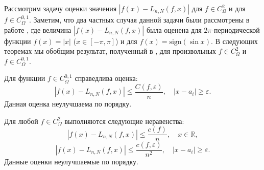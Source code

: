 Рассмотрим задачу оценки значения $\left|f(x)-L_{n,N}(f,x)\right|$ для $f\in C_{\Omega}^{2}$ и для $f\in C_{\Omega}^{0,1}$.
Заметим, что два частных случая данной задачи были рассмотрены в работе \cite{akniyev}, где величина $\left|f(x)-L_{n,N}(f,x)\right|$ была
оценена для $2\pi$-периодической функции $f(x) = |x|$ ($x \in [-\pi,\pi]$) и для $f(x) = \mbox{sign} (\sin x)$.
В следующих теоремах мы обобщим результат, полученный в \cite{akniyev}, для произвольных $f \in C_{\Omega}^{2}$ и $f \in C_{\Omega}^{0,1}$.
\begin{theorem}\label{theorem}
	Для функции $f \in C_{\Omega}^{0,1}$ справедлива оценка:
	\begin{equation}\label{theorem_result}
	\left| f(x) - L_{n,N}(f,x) \right| \leq \frac{C(f,\varepsilon)}{n}, \quad |x - a_i| \geq \varepsilon.
	\end{equation}
	Данная оценка неулучшаема по порядку.
\end{theorem}
\begin{theorem}
	\label{Th1} Для любой $f\in C_{\Omega}^{2}$ выполняются следующие неравенства:
	\begin{equation}\label{Th1:eq1}
	\left|f(x)-L_{n,N}(f,x)\right|\leq\frac{c(f)}{n},\quad x\in\mathbb{R},
	\end{equation}
	\begin{equation}\label{Th1:eq2}
	\left|f(x)-L_{n,N}(f,x)\right|\leq\frac{c(f,\varepsilon)}{n^{2}},\quad \left|x-a_{i}\right|\geq\varepsilon.
	\end{equation}
	Данные оценки неулучшаемые по порядку.
\end{theorem}


